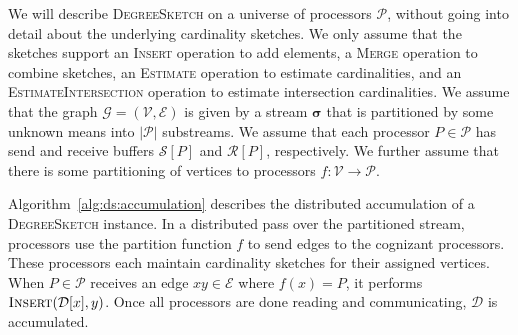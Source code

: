\documentclass{report}
\newcommand{\algoname}[1]{\textnormal{\textsc{#1}}}
\begin{document}
We will describe \algoname{DegreeSketch} on a universe of processors $\mathcal{P}$, without going into detail about the underlying cardinality sketches. 
We only assume that the sketches support an \algoname{Insert} operation to add elements, a \algoname{Merge} operation to combine sketches, an \algoname{Estimate} operation to estimate cardinalities, and an \algoname{EstimateIntersection} operation to estimate intersection cardinalities.
We assume that the graph $\mathcal{G} = (\mathcal{V}, \mathcal{E})$ is given by a stream $\boldsymbol{\sigma}$ that is partitioned by some unknown means into $|\mathcal{P}|$ substreams.
We assume that each processor $P \in \mathcal{P}$ has send and receive buffers $\mathcal{S}[P]$ and $\mathcal{R}[P]$, respectively.
We further assume that there is some partitioning of vertices to processors $f : \mathcal{V} \rightarrow \mathcal{P}$. 

Algorithm~\ref{alg:ds:accumulation} describes the distributed accumulation of a \algoname{DegreeSketch} instance.
In a distributed pass over the partitioned stream, processors use the partition function $f$ to send edges to the cognizant processors. 
These processors each maintain cardinality sketches for their assigned vertices.
When $P \in \mathcal{P}$ receives an edge $xy \in \mathcal{E}$ where $f(x) = P$, it performs $\algoname{Insert}(\mathcal{D}[x], y)$.
Once all processors are done reading and communicating, $\mathcal{D}$ is accumulated.
\end{document}
